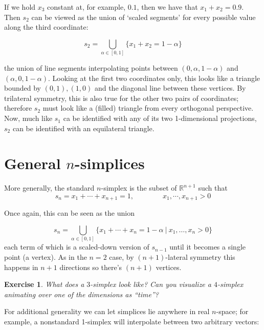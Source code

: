 \documentclass{tufte-handout}
\newtheorem{exercise}{Exercise}
\newcommand{\re}{\mathbb{R}}
\begin{document}
If we hold $x_3$ constant at, for example, $0.1$, then we have that $x_1+x_2=0.9$. 
Then $s_2$ can be viewed as the union of `scaled segments' for every possible value along the third coordinate:

\begin{equation}
    s_2 = \bigcup_{\alpha\in[0,1]} \{x_1+x_2 = 1-\alpha\} 
\end{equation}

the union of line segments interpolating points between $(0,\alpha,1-\alpha)$ and $(\alpha,0,1-\alpha)$. Looking at the first two coordinates only, this looks like a triangle bounded by $(0,1),(1,0)$ and the diagonal line between these vertices. By trilateral symmetry, this is also true for the other two pairs of coordinates; therefore $s_2$ must look like a (filled) triangle from every orthogonal perspective. Now, much like $s_1$ ca be identified with any of its two 1-dimensional projections, $s_2$ can be identified with an equilateral triangle.
\section{General $n$-simplices}
More generally, the standard $n$-simplex is the subset of $\re^{n+1}$ such that
\begin{equation}
    s_n = x_1 + \cdots + x_{n+1} = 1, \quad \quad \quad\quad x_1, \cdots, x_{n+1} > 0
\end{equation}

Once again, this can be seen as the union

\begin{equation}
  s_n =  \bigcup_{\alpha \in [0,1]} \{x_1+\cdots+x_n = 1-\alpha\ |\ x_1,\ldots,x_n>0\}
\end{equation}
each term of which is a scaled-down version of $s_{n-1}$ until it becomes a single point (a vertex). As in the $n=2$ case, by $(n+1)$-lateral symmetry this happens in $n+1$ directions so there's $(n+1)$ vertices.
\begin{exercise}
What does a $3$-simplex look like? Can you visualize a $4$-simplex animating over one of the dimensions as ``time''?
\end{exercise}

For additional generality we can let simplices lie anywhere in real $n$-space; for example, a nonstandard 1-simplex will interpolate between two arbitrary vectors:
\end{document}
